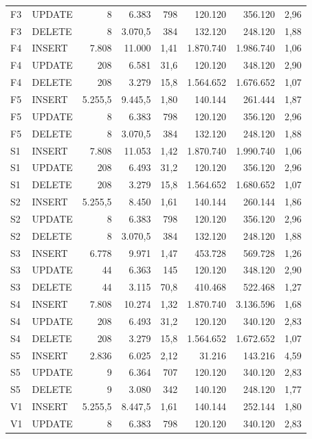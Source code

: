 {\begin{tabular}{llrrrrrr}
F3 & UPDATE & 8 & 6.383 & 798 & 120.120 & 356.120 & 2,96 \\
F3 & DELETE & 8 & 3.070,5 & 384 & 132.120 & 248.120 & 1,88 \\
F4 & INSERT & 7.808 & 11.000 & 1,41 & 1.870.740 & 1.986.740 & 1,06 \\
F4 & UPDATE & 208 & 6.581 & 31,6 & 120.120 & 348.120 & 2,90 \\
F4 & DELETE & 208 & 3.279 & 15,8 & 1.564.652 & 1.676.652 & 1,07 \\
F5 & INSERT & 5.255,5 & 9.445,5 & 1,80 & 140.144 & 261.444 & 1,87 \\
F5 & UPDATE & 8 & 6.383 & 798 & 120.120 & 356.120 & 2,96 \\
F5 & DELETE & 8 & 3.070,5 & 384 & 132.120 & 248.120 & 1,88 \\
S1 & INSERT & 7.808 & 11.053 & 1,42 & 1.870.740 & 1.990.740 & 1,06 \\
S1 & UPDATE & 208 & 6.493 & 31,2 & 120.120 & 356.120 & 2,96 \\
S1 & DELETE & 208 & 3.279 & 15,8 & 1.564.652 & 1.680.652 & 1,07 \\
S2 & INSERT & 5.255,5 & 8.450 & 1,61 & 140.144 & 260.144 & 1,86 \\
S2 & UPDATE & 8 & 6.383 & 798 & 120.120 & 356.120 & 2,96 \\
S2 & DELETE & 8 & 3.070,5 & 384 & 132.120 & 248.120 & 1,88 \\
S3 & INSERT & 6.778 & 9.971 & 1,47 & 453.728 & 569.728 & 1,26 \\
S3 & UPDATE & 44 & 6.363 & 145 & 120.120 & 348.120 & 2,90 \\
S3 & DELETE & 44 & 3.115 & 70,8 & 410.468 & 522.468 & 1,27 \\
S4 & INSERT & 7.808 & 10.274 & 1,32 & 1.870.740 & 3.136.596 & 1,68 \\
S4 & UPDATE & 208 & 6.493 & 31,2 & 120.120 & 340.120 & 2,83 \\
S4 & DELETE & 208 & 3.279 & 15,8 & 1.564.652 & 1.672.652 & 1,07 \\
S5 & INSERT & 2.836 & 6.025 & 2,12 & 31.216 & 143.216 & 4,59 \\
S5 & UPDATE & 9 & 6.364 & 707 & 120.120 & 340.120 & 2,83 \\
S5 & DELETE & 9 & 3.080 & 342 & 140.120 & 248.120 & 1,77 \\
V1 & INSERT & 5.255,5 & 8.447,5 & 1,61 & 140.144 & 252.144 & 1,80 \\
V1 & UPDATE & 8 & 6.383 & 798 & 120.120 & 340.120 & 2,83 \\

\end{tabular}}
